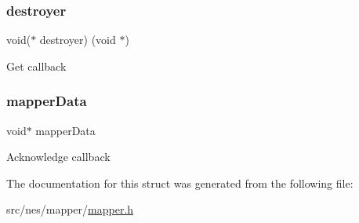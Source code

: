 \subsubsection{\texorpdfstring{destroyer}{destroyer}}
{\footnotesize\ttfamily void($\ast$ destroyer) (void $\ast$)}

Get callback \mbox{\label{struct_mapper_a417be0ec6d49a8fade0fa596656d1d43}} 
\subsubsection{\texorpdfstring{mapper\+Data}{mapperData}}
{\footnotesize\ttfamily void$\ast$ mapper\+Data}

Acknowledge callback 

The documentation for this struct was generated from the following file\+:\begin{DoxyCompactItemize}
\item 
src/nes/mapper/\hyperlink{mapper_8h}{mapper.\+h}\end{DoxyCompactItemize}
